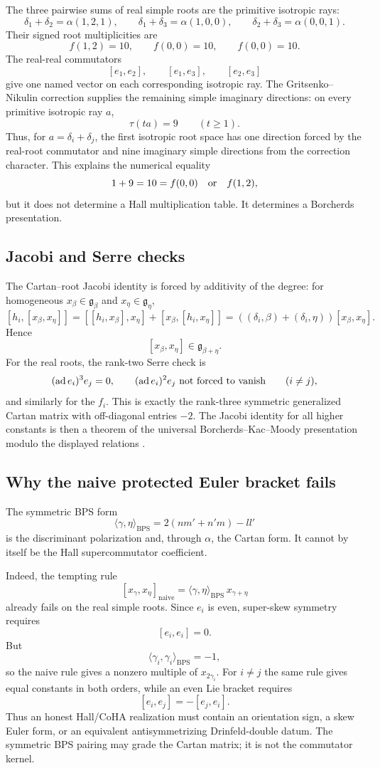 The three pairwise sums of real simple roots are the primitive isotropic
rays:
$$
\delta_1+\delta_2=\alpha(1,2,1),\qquad
\delta_1+\delta_3=\alpha(1,0,0),\qquad
\delta_2+\delta_3=\alpha(0,0,1).
$$
Their signed root multiplicities are
$$
f(1,2)=10,\qquad f(0,0)=10,\qquad f(0,0)=10.
$$
The real-real commutators
$$
[e_1,e_2],\qquad [e_1,e_3],\qquad [e_2,e_3]
$$
give one named vector on each corresponding isotropic ray.  The
Gritsenko--Nikulin correction supplies the remaining simple imaginary
directions: on every primitive isotropic ray \(a\),
$$
\tau(ta)=9\qquad(t\geq1).
$$
Thus, for \(a=\delta_i+\delta_j\), the first isotropic root space has
one direction forced by the real-root commutator and nine imaginary
simple directions from the correction character.  This explains the
numerical equality
$$
1+9=10=f(0,0)\quad\hbox{or}\quad f(1,2),
$$
but it does not determine a Hall multiplication table.  It determines a
Borcherds presentation.

\subsection{Jacobi and Serre checks}

The Cartan--root Jacobi identity is forced by additivity of the degree:
for homogeneous \(x_\beta\in\mathfrak g_\beta\) and
\(x_\eta\in\mathfrak g_\eta\),
$$
[h_i,[x_\beta,x_\eta]]
=[ [h_i,x_\beta],x_\eta]+[x_\beta,[h_i,x_\eta]]
=((\delta_i,\beta)+(\delta_i,\eta))[x_\beta,x_\eta].
$$
Hence
$$
[x_\beta,x_\eta]\in\mathfrak g_{\beta+\eta}.
$$
For the real roots, the rank-two Serre check is
$$
(\operatorname{ad}e_i)^3e_j=0,\qquad
(\operatorname{ad}e_i)^2e_j\ \hbox{not forced to vanish}
\qquad(i\neq j),
$$
and similarly for the \(f_i\).  This is exactly the rank-three
symmetric generalized Cartan matrix with off-diagonal entries \(-2\).
The Jacobi identity for all higher constants is then a theorem of the
universal Borcherds--Kac--Moody presentation modulo the displayed
relations \cite{KAC:1,GN}.

\subsection{Why the naive protected Euler bracket fails}

The symmetric BPS form
$$
\langle\gamma,\eta\rangle_{\mathrm{BPS}}
=2(nm'+n'm)-ll'
$$
is the discriminant polarization and, through \(\alpha\), the Cartan
form.  It cannot by itself be the Hall supercommutator coefficient.

Indeed, the tempting rule
$$
[x_\gamma,x_\eta]_{\mathrm{naive}}
=\langle\gamma,\eta\rangle_{\mathrm{BPS}}\,x_{\gamma+\eta}
$$
already fails on the real simple roots.  Since \(e_i\) is even,
super-skew symmetry requires
$$
[e_i,e_i]=0.
$$
But
$$
\langle\gamma_i,\gamma_i\rangle_{\mathrm{BPS}}=-1,
$$
so the naive rule gives a nonzero multiple of \(x_{2\gamma_i}\).  For
\(i\neq j\) the same rule gives equal constants in both orders, while
an even Lie bracket requires
$$
[e_i,e_j]=-[e_j,e_i].
$$
Thus an honest Hall/CoHA realization must contain an orientation sign,
a skew Euler form, or an equivalent antisymmetrizing Drinfeld-double
datum.  The symmetric BPS pairing may grade the Cartan matrix; it is not
the commutator kernel.

